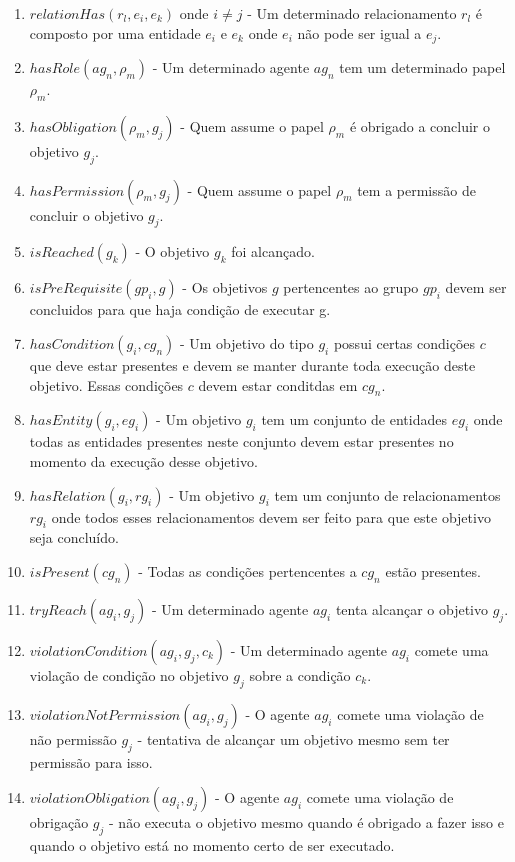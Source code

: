 \documentclass[12pt]{article}
\begin{document}
\begin{enumerate}
	\item $relationHas(r_l,e_i,e_k)$ onde $i \neq j$ - Um determinado relacionamento $r_l$ é composto por uma entidade $e_i$ e $e_k$ onde $e_i$ não pode ser igual a $e_j$.	
	\item $hasRole(ag_n,\rho_m)$ - Um determinado agente $ag_n$ tem um determinado papel $\rho_m$.
	\item $hasObligation(\rho_m,g_j)$ - Quem assume o papel $\rho_m$ é obrigado a concluir o objetivo $g_j$.
	\item $hasPermission(\rho_m,g_j)$ - Quem assume o papel $\rho_m$ tem a permissão de concluir o objetivo $g_j$.
	\item $isReached(g_k)$ - O objetivo $g_k$ foi alcançado.
	\item $isPreRequisite(gp_i,g)$ - Os objetivos $g$ pertencentes ao grupo $gp_i$ devem ser concluidos para que haja condição de executar g.
	\item $hasCondition(g_i,cg_n)$ - Um objetivo do tipo $g_i$ possui certas condições $c$ que deve estar presentes e devem se manter durante toda execução deste objetivo. Essas condições $c$ devem estar conditdas em $cg_n$. 
	\item $hasEntity(g_i,eg_i)$ - Um objetivo $g_i$ tem um conjunto de entidades $eg_i$ onde todas as entidades presentes neste conjunto devem estar presentes no momento da execução desse objetivo.
	\item $hasRelation(g_i,rg_i)$ - Um objetivo $g_i$ tem um conjunto de relacionamentos $rg_i$ onde todos esses relacionamentos devem ser feito para que este objetivo seja concluído.
	\item $isPresent(cg_n)$ - Todas as condições pertencentes a $cg_n$ estão presentes.
	\item $tryReach(ag_i,g_j)$ - Um determinado agente $ag_i$ tenta alcançar o objetivo $g_j$.
	\item $violationCondition(ag_i,g_j,c_k)$ - Um determinado agente $ag_i$ comete uma violação de condição no objetivo $g_j$ sobre a condição $c_k$. 
	\item $violationNotPermission(ag_i,g_j)$ - O agente $ag_i$ comete uma violação de não permissão $g_j$ - tentativa de alcançar um objetivo mesmo sem ter permissão para isso. 
	\item $violationObligation(ag_i,g_j)$ - O agente $ag_i$ comete uma violação de obrigação $g_j$ - não executa o objetivo mesmo quando é obrigado a fazer isso e quando o objetivo está no momento certo de ser executado.

\end{enumerate}
\end{document}
